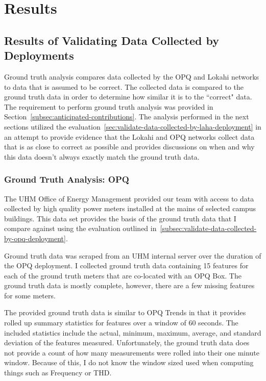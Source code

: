 \chapter{Results}\label{ch:results}

\section{Results of Validating Data Collected by Deployments}\label{sec:ground-truth-analysis}

Ground truth analysis compares data collected by the OPQ and Lokahi networks to data that is assumed to be correct. The collected data is compared to the ground truth data in order to determine how similar it is to the ``correct" data. The requirement to perform ground truth analysis was provided in Section~\ref{subsec:anticipated-contributions}. The analysis performed in the next sections utilized the evaluation~\ref{sec:validate-data-collected-by-laha-deployment} in an attempt to provide evidence that the Lokahi and OPQ networks collect data that is as close to correct as possible and provides discussions on when and why this data doesn't always exactly match the ground truth data.

\subsection{Ground Truth Analysis: OPQ}\label{subsec:ground-truth-analysis:-opq}

The UHM Office of Energy Management provided our team with access to data collected by high quality power meters installed at the mains of selected campus buildings. This data set provides the basis of the ground truth data that I compare against using the evaluation outlined in~\ref{subsec:validate-data-collected-by-opq-deployment}.

Ground truth data was scraped from an UHM internal server over the duration of the OPQ deployment. I collected ground truth data containing 15 features for each of the ground truth meters that are co-located with an OPQ Box. The ground truth data is mostly complete, however, there are a few missing features for some meters.

The provided ground truth data is similar to OPQ Trends in that it provides rolled up summary statistics for features over a window of 60 seconds. The included statistics include the actual, minimum, maximum, average, and standard deviation of the features measured. Unfortunately, the ground truth data does not provide a count of how many measurements were rolled into their one minute window. Because of this, I do not know the window sized used when computing things such as Frequency or THD.

